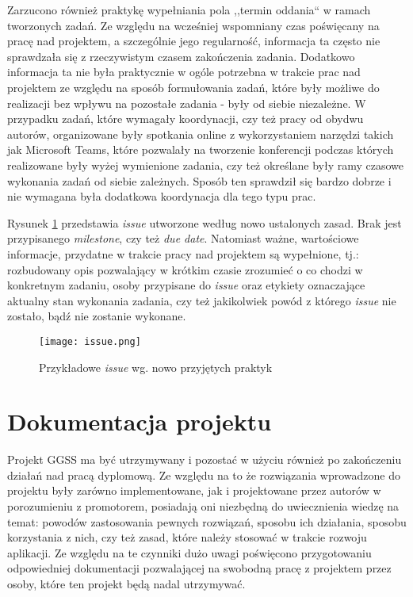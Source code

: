 Zarzucono również praktykę wypełniania pola ,,termin oddania`` w ramach tworzonych zadań. Ze względu na  wcześniej wspomniany czas poświęcany na pracę nad projektem, a szczególnie jego regularność, informacja ta często nie sprawdzała się z rzeczywistym czasem zakończenia zadania. Dodatkowo informacja ta nie była praktycznie w ogóle potrzebna w trakcie prac nad projektem ze względu na sposób formułowania zadań, które były możliwe do realizacji bez wpływu na pozostałe zadania - były od siebie niezależne. W przypadku zadań, które wymagały koordynacji, czy też pracy od obydwu autorów, organizowane były spotkania online z wykorzystaniem narzędzi takich jak Microsoft Teams, które pozwalały na tworzenie konferencji podczas których realizowane były wyżej wymienione zadania, czy też określane były ramy czasowe wykonania zadań od siebie zależnych. Sposób ten sprawdził się bardzo dobrze i nie wymagana była dodatkowa koordynacja dla tego typu prac.

Rysunek \ref{fig:issue} przedstawia \emph{issue} utworzone według nowo ustalonych zasad. Brak jest przypisanego \emph{milestone}, czy też \emph{due date}. Natomiast ważne, wartościowe informacje, przydatne w trakcie pracy nad projektem są wypełnione, tj.: rozbudowany opis pozwalający w krótkim czasie zrozumieć o co chodzi w konkretnym zadaniu, osoby przypisane do \emph{issue} oraz etykiety oznaczające aktualny stan wykonania zadania, czy też jakikolwiek powód z którego \emph{issue} nie zostało, bądź nie zostanie wykonane.

\begin{figure}[H]
    \centering
    \texttt{[image: issue.png]}
    \caption{Przykładowe \emph{issue} wg. nowo przyjętych praktyk}
    \label{fig:issue}
\end{figure}


\newpage
\section{Dokumentacja projektu}

Projekt GGSS ma być utrzymywany i pozostać w użyciu również po zakończeniu działań nad pracą dyplomową. Ze względu na to że rozwiązania wprowadzone do projektu były zarówno implementowane, jak i projektowane przez autorów w porozumieniu z promotorem, posiadają oni niezbędną do uwiecznienia wiedzę na temat: powodów zastosowania pewnych rozwiązań, sposobu ich działania, sposobu korzystania z nich, czy też zasad, które należy stosować w trakcie rozwoju aplikacji. Ze względu na te czynniki dużo uwagi poświęcono przygotowaniu odpowiedniej dokumentacji pozwalającej na swobodną pracę z projektem przez osoby, które ten projekt będą nadal utrzymywać.

